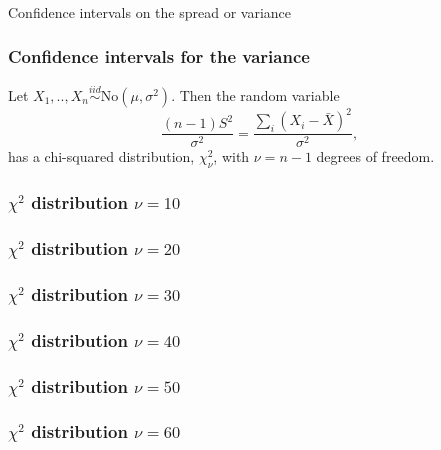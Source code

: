 \begin{frame}[fragile]\frametitle{}
\begin{center}
{\Large Confidence intervals on the spread or variance}

\end{center}
\end{frame}


\begin{frame}[fragile]\frametitle{Confidence intervals for the variance}

\begin{defn}

Let $X_1,..,X_n \stackrel{iid}{\sim} \mbox{No}(\mu,\sigma^2)$.
Then the random variable
$$\frac{(n-1)S^2}{\sigma^2} =
\frac{\sum_i(X_i-\bar{X})^2}{\sigma^2},$$
has a chi-squared distribution, $\chi^2_{\nu}$, with $\nu = n-1$ degrees
of freedom.
\end{defn}

\end{frame}

\begin{frame}[fragile]\frametitle{$\chi^2$ distribution $\nu=10$}

\end{frame}

\begin{frame}[fragile]\frametitle{$\chi^2$ distribution $\nu=20$}

\end{frame}

\begin{frame}[fragile]\frametitle{$\chi^2$ distribution $\nu=30$}

\end{frame}
\begin{frame}[fragile]\frametitle{$\chi^2$ distribution $\nu=40$}

\end{frame}

\begin{frame}[fragile]\frametitle{$\chi^2$ distribution $\nu=50$}

\end{frame}

\begin{frame}[fragile]\frametitle{$\chi^2$ distribution $\nu=60$}

\end{frame}

